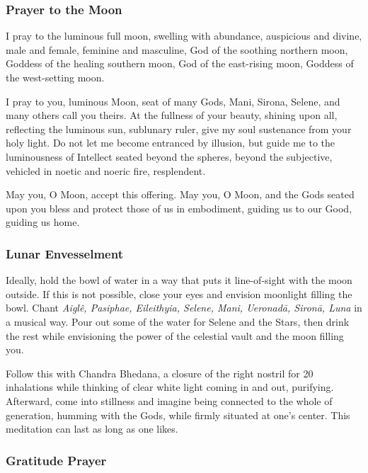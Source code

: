 \documentclass[
]{book}
\begin{document}
\hypertarget{prayer-to-the-moon-1}{%
\subsubsection{Prayer to the Moon}\label{prayer-to-the-moon-1}}

I pray to the luminous full moon,
swelling with abundance,
auspicious and divine,
male and female, feminine and masculine,
God of the soothing northern moon,
Goddess of the healing southern moon,
God of the east-rising moon,
Goddess of the west-setting moon.

I pray to you, luminous Moon, seat of many Gods,
Mani, Sirona, Selene, and many others call you theirs.
At the fullness of your beauty, shining upon all,
reflecting the luminous sun, sublunary ruler,
give my soul sustenance from your holy light.
Do not let me become entranced by illusion,
but guide me to the luminousness of Intellect
seated beyond the spheres, beyond the subjective,
vehicled in noetic and noeric fire, resplendent.

May you, O Moon, accept this offering.
May you, O Moon, and the Gods seated upon you
bless and protect those of us in embodiment,
guiding us to our Good, guiding us home.

\hypertarget{lunar-envesselment}{%
\subsubsection{Lunar Envesselment}\label{lunar-envesselment}}

Ideally, hold the bowl of water in a way that puts it line-of-sight with the moon outside. If this is not possible, close your eyes and envision moonlight filling the bowl. Chant \emph{Aiglê, Pasiphae, Eileithyia, Selene, Mani, Ueronadā, Sironā, Luna} in a musical way. Pour out some of the water for Selene and the Stars, then drink the rest while envisioning the power of the celestial vault and the moon filling you.

Follow this with Chandra Bhedana, a closure of the right nostril for 20 inhalations while thinking of clear white light coming in and out, purifying. Afterward, come into stillness and imagine being connected to the whole of generation, humming with the Gods, while firmly situated at one's center. This meditation can last as long as one likes.

\hypertarget{gratitude-prayer-1}{%
\subsubsection{Gratitude Prayer}\label{gratitude-prayer-1}}
\end{document}
